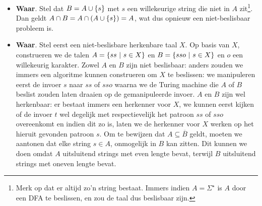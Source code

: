 \documentclass{article}
\begin{document}
\begin{question}[Beslisbaarheid]
\begin{answer}
\begin{itemize}
 \item \textbf{Waar}. Stel dat $B=A\cup\left\{ s \right\}$ met $s$ een willekeurige string die niet in $A$ zit\footnote{Merk op dat er altijd zo'n string bestaat. Immers indien $A=\Sigma^{\star}$ is $A$ door een DFA te beslissen, en zou de taal dus beslisbaar zijn.}. Dan geldt $A\cap B=A\cap\left( A\cup\left\{ s \right\} \right)=A$, wat dus opnieuw een niet-beslisbaar probleem is.
 \item \textbf{Waar}. Stel eerst een niet-beslisbare herkenbare taal $X$. Op basis van $X$, construeren we de talen $A=\left\{ ss\ |\ s\in X \right\}$ en $B=\left\{ sso\ |\ s\in X \right\}$ en $o$ een willekeurig karakter. Zowel $A$ en $B$ zijn niet beslisbaar: anders zouden we immers een algoritme kunnen construeren om $X$ te beslissen: we manipuleren eerst de invoer $s$ naar $ss$ of $sso$ waarna we de Turing machine die $A$ of $B$ beslist zouden laten draaien op de gemanipuleerde invoer. $A$ en $B$ zijn wel herkenbaar: er bestaat immers een herkenner voor $X$, we kunnen eerst kijken of de invoer $t$ wel degelijk met respectievelijk het patroon $ss$ of $sso$ overeenkomt en indien dit zo is, laten we de herkenner voor $X$ werken op het hieruit gevonden patroon $s$. Om te bewijzen dat $A\subseteq\overline{B}$ geldt, moeten we aantonen dat elke string $s\in A$, onmogelijk in $B$ kan zitten. Dit kunnen we doen omdat $A$ uitsluitend strings met even lengte bevat, terwijl $B$ uitsluitend strings met oneven lengte bevat.
\end{itemize}
\end{answer}
\end{question}
\end{document}
